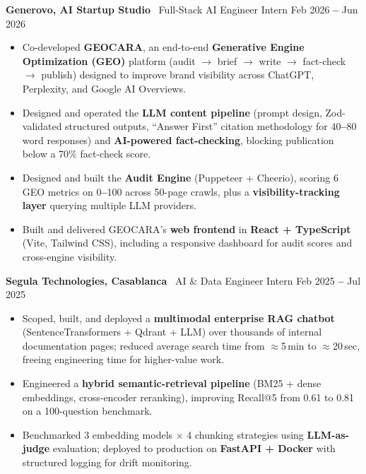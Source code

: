 \documentclass[10pt,a4paper]{article}
\newcommand{\role}[3]{%
  \vspace{1pt}\noindent\textbf{#1} \textbar\ #2 \hfill \textcolor{mutedgray}{\small #3}\par\vspace{-2pt}
}
\begin{document}
\role{Generovo, AI Startup Studio}{Full-Stack AI Engineer Intern}{Feb 2026 \textbf{--} Jun 2026}
\begin{itemize}
    \item Co-developed \textbf{GEOCARA}, an end-to-end \textbf{Generative Engine Optimization (GEO)} platform (audit $\to$ brief $\to$ write $\to$ fact-check $\to$ publish) designed to improve brand visibility across ChatGPT, Perplexity, and Google AI Overviews.
    \item Designed and operated the \textbf{LLM content pipeline} (prompt design, Zod-validated structured outputs, “Answer First” citation methodology for 40\textbf{--}80\,word responses) and \textbf{AI-powered fact-checking}, blocking publication below a 70\% fact-check score.
    \item Designed and built the \textbf{Audit Engine} (Puppeteer + Cheerio), scoring 6 GEO metrics on 0\textbf{--}100 across 50-page crawls, plus a \textbf{visibility-tracking layer} querying multiple LLM providers.
    \item Built and delivered GEOCARA's \textbf{web frontend} in \textbf{React + TypeScript} (Vite, Tailwind CSS), including a responsive dashboard for audit scores and cross-engine visibility.
\end{itemize}\vspace{-6pt}

\role{Segula Technologies, Casablanca}{AI \& Data Engineer Intern}{Feb 2025 \textbf{--} Jul 2025}
\begin{itemize}
    \item Scoped, built, and deployed a \textbf{multimodal enterprise RAG chatbot} (SentenceTransformers + Qdrant + LLM) over thousands of internal documentation pages; reduced average search time from $\approx$5\,min to $\approx$20\,sec, freeing engineering time for higher-value work.
    \item Engineered a \textbf{hybrid semantic-retrieval pipeline} (BM25 + dense embeddings, cross-encoder reranking), improving Recall@5 from 0.61 to 0.81 on a 100-question benchmark.
    \item Benchmarked 3 embedding models $\times$ 4 chunking strategies using \textbf{LLM-as-judge} evaluation; deployed to production on \textbf{FastAPI + Docker} with structured logging for drift monitoring.
\end{itemize}\vspace{-6pt}
\end{document}
